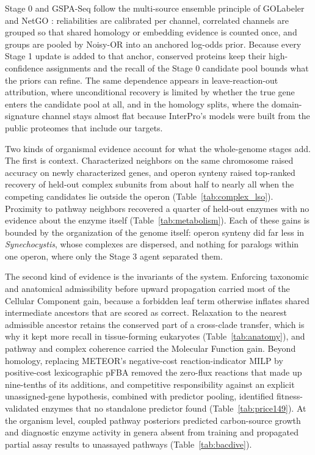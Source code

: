 \documentclass[10pt,twocolumn]{article}
\begin{document}
Stage 0 and GSPA-Seq follow the multi-source ensemble principle of GOLabeler \citep{you2018golabeler} and NetGO \citep{you2019netgo,wang2023netgo3}: reliabilities are calibrated per channel, correlated channels are grouped so that shared homology or embedding evidence is counted once, and groups are pooled by Noisy-OR into an anchored log-odds prior. Because every Stage 1 update is added to that anchor, conserved proteins keep their high-confidence assignments and the recall of the Stage 0 candidate pool bounds what the priors can refine. The same dependence appears in leave-reaction-out attribution, where unconditional recovery is limited by whether the true gene enters the candidate pool at all, and in the homology splits, where the domain-signature channel stays almost flat because InterPro's models were built from the public proteomes that include our targets.

Two kinds of organismal evidence account for what the whole-genome stages add. The first is context. Characterized neighbors on the same chromosome raised accuracy on newly characterized genes, and operon synteny raised top-ranked recovery of held-out complex subunits from about half to nearly all when the competing candidates lie outside the operon (Table~\ref{tab:complex_lso}). Proximity to pathway neighbors recovered a quarter of held-out enzymes with no evidence about the enzyme itself (Table~\ref{tab:metabolism}). Each of these gains is bounded by the organization of the genome itself: operon synteny did far less in \textit{Synechocystis}, whose complexes are dispersed, and nothing for paralogs within one operon, where only the Stage 3 agent separated them.

The second kind of evidence is the invariants of the system. Enforcing taxonomic and anatomical admissibility before upward propagation carried most of the Cellular Component gain, because a forbidden leaf term otherwise inflates shared intermediate ancestors that are scored as correct. Relaxation to the nearest admissible ancestor retains the conserved part of a cross-clade transfer, which is why it kept more recall in tissue-forming eukaryotes (Table~\ref{tab:anatomy}), and pathway and complex coherence carried the Molecular Function gain. Beyond homology, replacing METEOR's negative-cost reaction-indicator MILP \citep{niu2026meteor} by positive-cost lexicographic pFBA \citep{lewis2010omic} removed the zero-flux reactions that made up nine-tenths of its additions, and competitive responsibility against an explicit unassigned-gene hypothesis, combined with predictor pooling, identified fitness-validated enzymes that no standalone predictor found (Table~\ref{tab:price149}). At the organism level, coupled pathway posteriors predicted carbon-source growth and diagnostic enzyme activity in genera absent from training and propagated partial assay results to unassayed pathways (Table~\ref{tab:bacdive}).
\end{document}
